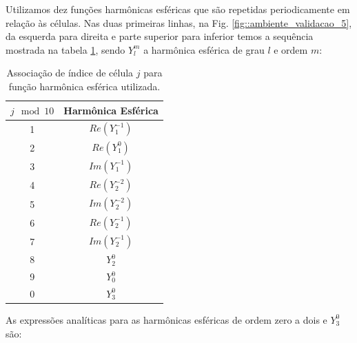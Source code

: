 Utilizamos dez funções harmônicas esféricas que são repetidas periodicamente em relação às células. Nas duas primeiras linhas, na Fig. \ref{fig::ambiente_validacao_5}, da esquerda para direita e parte superior para inferior temos a sequência mostrada na tabela \ref{tab::harmonicas_esfericas}, sendo $Y_l^m$ a harmônica esférica de grau $l$ e ordem $m$:

\begin{table}[ht]
\centering
\begin{tabular}{cc}
$j \mod 10$ & Harmônica Esférica \\ \hline
1 & $Re(Y_1^{-1})$  \\
2 & $Re(Y_1^0)$     \\
3 & $Im(Y_1^{-1})$  \\
4 & $Re(Y_2^{-2})$  \\
5 & $Im(Y_2^{-2})$  \\
6 & $Re(Y_2^{-1})$  \\
7 & $Im(Y_2^{-1})$  \\
8 & $Y_2^0$         \\
9 & $Y_0^0$         \\
0 & $Y_3^0$        
\end{tabular}
\caption{Associação de índice de célula $j$ para função harmônica esférica utilizada.}
\label{tab::harmonicas_esfericas}
\end{table}

As expressões analíticas para as harmônicas esféricas de ordem zero a dois e $Y_3^0$ são:


